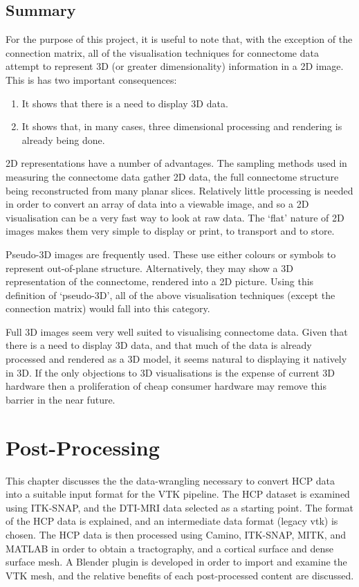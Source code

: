 \documentclass[MSc,paper=a4,pagesize=auto]{icldt}
\begin{document}
\section{Summary}
For the purpose of this project, it is useful to note that, with the exception of the connection matrix, all of the visualisation techniques for connectome data attempt to represent 3D (or greater dimensionality) information in a 2D image. This is has two important consequences:
\begin{enumerate}
\item It shows that there is a need to display 3D data.
\item It shows that, in many cases, three dimensional processing and rendering is already being done.
\end{enumerate}

2D representations have a number of advantages. The sampling methods used in measuring the connectome data gather 2D data, the full connectome structure being reconstructed from many planar slices. Relatively little processing is needed in order to convert an array of data into a viewable image, and so a 2D visualisation can be a very fast way to look at raw data. The ‘flat’ nature of 2D images makes them very simple to display or print, to transport and to store. 

Pseudo-3D images are frequently used. These use either colours or symbols to represent out-of-plane structure. Alternatively, they may show a 3D representation of the connectome, rendered into a 2D picture. Using this definition of ‘pseudo-3D’, all of the above visualisation techniques (except the connection matrix) would fall into this category. 

Full 3D images seem very well suited to visualising connectome data. Given that there is a need to display 3D data, and that much of the data is already processed and rendered as a 3D model, it seems natural to displaying it natively in 3D. If the only objections to 3D visualisations is the expense of current 3D hardware \cite{Margulies2013} then a proliferation of cheap consumer hardware may remove this barrier in the near future. 

\chapter{Post-Processing}

This chapter discusses the the data-wrangling necessary to convert HCP data into a suitable input format for the VTK pipeline. The HCP dataset is examined using ITK-SNAP, and the DTI-MRI data selected as a starting point. The format of the HCP data is explained, and an intermediate data format (legacy vtk) is chosen. The HCP data is then processed using Camino, ITK-SNAP, MITK, and MATLAB in order to obtain a tractography, and a cortical surface and dense surface mesh. A Blender plugin is developed in order to import and examine the VTK mesh, and the relative benefits of each post-processed content are discussed.  
\end{document}
